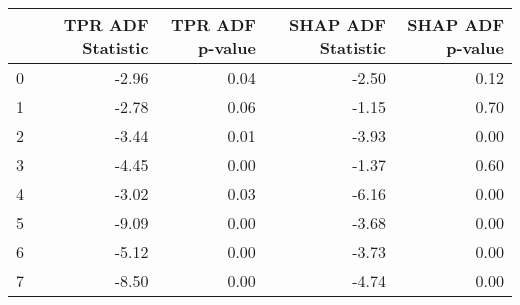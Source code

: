 \begin{tabular}{lrrrr}
\toprule
 & TPR ADF Statistic & TPR ADF p-value & SHAP ADF Statistic & SHAP ADF p-value \\
\midrule
0 & -2.96 & 0.04 & -2.50 & 0.12 \\
1 & -2.78 & 0.06 & -1.15 & 0.70 \\
2 & -3.44 & 0.01 & -3.93 & 0.00 \\
3 & -4.45 & 0.00 & -1.37 & 0.60 \\
4 & -3.02 & 0.03 & -6.16 & 0.00 \\
5 & -9.09 & 0.00 & -3.68 & 0.00 \\
6 & -5.12 & 0.00 & -3.73 & 0.00 \\
7 & -8.50 & 0.00 & -4.74 & 0.00 \\
\bottomrule
\end{tabular}
